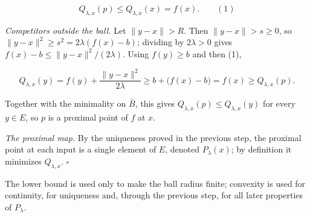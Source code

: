 \documentclass[11pt,a4paper]{article}
\begin{document}
\[Q_{\lambda,x}(p)\le Q_{\lambda,x}(x)=f(x).\qquad(1)\]


\emph{Competitors outside the ball.} Let \(\|y-x\|>R\). Then \(\|y-x\|>s\ge0\), so \(\|y-x\|^2\ge s^2=2\lambda(f(x)-b)\); dividing by \(2\lambda>0\) gives \(f(x)-b\le\|y-x\|^2/(2\lambda)\). Using \(f(y)\ge b\) and then (1),


\[Q_{\lambda,x}(y)=f(y)+\frac{\|y-x\|^2}{2\lambda}\ge b+\bigl(f(x)-b\bigr)=f(x)\ge Q_{\lambda,x}(p).\]


Together with the minimality on \(\bar B\), this gives \(Q_{\lambda,x}(p)\le Q_{\lambda,x}(y)\) for every \(y\in E\), so \(p\) is a proximal point of \(f\) at \(x\).




\emph{The proximal map.} By the uniqueness proved in the previous step, the proximal point at each input is a single element of \(E\), denoted \(P_\lambda(x)\); by definition it minimizes \(Q_{\lambda,x}\). \(\square\)




The lower bound is used only to make the ball radius finite; convexity is used for continuity, for uniqueness and, through the previous step, for all later properties of \(P_\lambda\).
\end{document}
